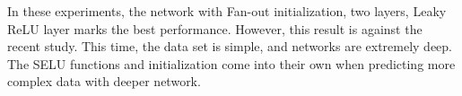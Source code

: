 \documentclass{article}
\begin{document}
In these experiments, the network with Fan-out initialization, two layers, Leaky ReLU layer marks the best performance. However, this result is against the recent study. This time, the data set is simple, and networks are extremely deep. The SELU functions and initialization come into their own when predicting more complex data with deeper network.
% 
\end{document}
